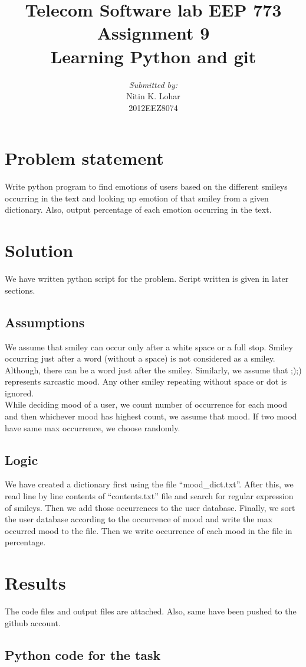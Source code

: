 \documentclass[a4paper,10pt]{report}
\title{Telecom Software lab EEP 773\\Assignment 9\\{\bf \color{blue}Learning Python and git}}
\author{\emph{Submitted by:}\\Nitin K. Lohar\\2012EEZ8074}
\begin{document}
\maketitle
\tableofcontents

\chapter{Problem statement}
Write python program to find emotions of users based on the different smileys occurring in the
text and looking up emotion of that smiley from a given dictionary. Also, output percentage of
each emotion occurring in the text.

\chapter{Solution}
We have written python script for the problem. Script written is given in later sections.

\section{Assumptions}
We assume that smiley can occur only after a white space or a full stop. Smiley occurring just after a word (without a
space) is not considered as a smiley. Although, there can be a word just after the smiley. Similarly, we assume that ;);)
represents sarcastic mood. Any other smiley repeating without space or dot is ignored.\\
While deciding mood of a user, we count number of occurrence for each mood and then whichever mood has highest count, we assume 
that mood. If two mood have same max occurrence, we choose randomly.

\section{Logic}
We have created a dictionary first using the file ``mood\_dict.txt''. After this, we read line by line contents of ``contents.txt'' file
and search for regular expression of smileys. Then we add those occurrences to the user database. Finally, we sort the user database according
to the occurrence of mood and write the max occurred mood to the file. Then we write occurrence of each mood in the file in percentage.

\chapter{Results}
The code files and output files are attached. Also, same have been pushed to the github account.

\section{Python code for the task}

\end{document}
